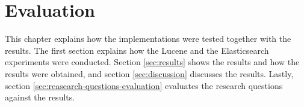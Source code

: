 \chapter{Evaluation}
\label{ch:evaluation}
This chapter explains how the implementations were tested together with the results.
The first section explains how the Lucene and the Elasticsearch experiments were conducted.
Section \ref{sec:results} shows the results and how the results were obtained,
and section \ref{sec:discussion} discusses the results.
Lastly, section \ref{sec:reasearch-questions-evaluation} evaluates the research questions against the results.





